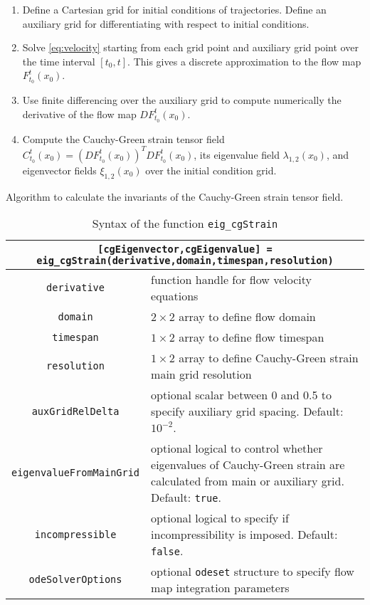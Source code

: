 \documentclass[5p]{elsarticle}
\begin{document}
\begin{table}
\begin{enumerate}
\item Define a Cartesian grid for initial conditions of trajectories. Define an auxiliary grid for differentiating with respect to initial conditions.
\item Solve \cref{eq:velocity} starting from each grid point and auxiliary grid point over the time interval $[t_0,t]$. This gives a discrete approximation to the flow map $F_{t_0}^t(x_0)$.
\item Use finite differencing over the auxiliary grid to compute numerically the derivative of the flow map $DF_{t_0}^t(x_0)$.
\item Compute the Cauchy-Green strain tensor field $C_{t_0}^t(x_0) = \left(DF_{t_0}^t(x_0)\right)^T DF_{t_0}^t(x_0)$, its eigenvalue field $\lambda_{1,2}(x_0)$, and eigenvector fields $\xi_{1,2}(x_0)$ over the initial condition grid.
\end{enumerate}
\caption{Algorithm to calculate the invariants of the Cauchy-Green strain tensor field.}
\label{t:Cauchy-Green algorithm}
\end{table}

\begin{table*}
\begin{center}
\begin{tabular}{|c|p{}|}
\hline
\multicolumn{2}{|p{.95\textwidth}|}{\lstinline![cgEigenvector,cgEigenvalue] = eig_cgStrain(derivative,domain,timespan,resolution)!}\tabularnewline
\hline \hline
\lstinline!derivative! & function handle for flow velocity equations\tabularnewline
\hline
\lstinline!domain! & $2 \times 2$ array to define flow domain\tabularnewline
\hline
\lstinline!timespan! & $1 \times 2$ array to define flow timespan\tabularnewline
\hline
\lstinline!resolution! & $1 \times 2$ array to define Cauchy-Green strain main grid resolution\tabularnewline
\hline
\lstinline!auxGridRelDelta! & optional scalar between 0 and 0.5 to specify auxiliary grid spacing. Default: $10^{-2}$.\tabularnewline
\hline
\lstinline!eigenvalueFromMainGrid! & optional logical to control whether eigenvalues of Cauchy-Green strain are calculated from main or auxiliary grid. Default: \lstinline!true!.\tabularnewline
\hline
\lstinline!incompressible! & optional logical to specify if incompressibility is imposed. Default: \lstinline!false!.\tabularnewline
\hline
\lstinline!odeSolverOptions! & optional \lstinline!odeset! structure to specify flow map integration parameters\tabularnewline
\hline
\end{tabular}
\caption{Syntax of the function \lstinline!eig_cgStrain!}
\label{t:eig_cgStrain syntax}
\end{center}
\end{table*}
\end{document}
